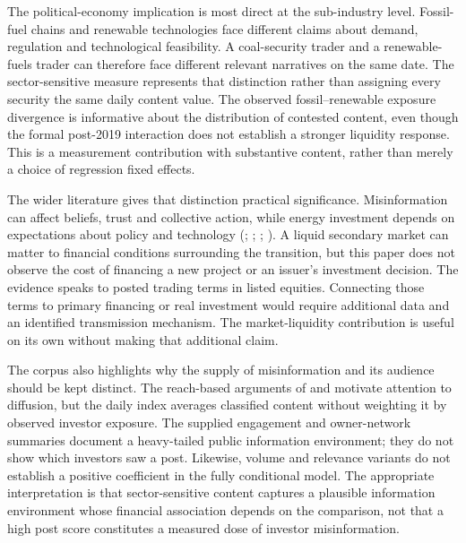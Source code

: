\documentclass{article}
\theoremstyle{plain}
\begin{document}
The political-economy implication is most direct at the sub-industry level. Fossil-fuel chains and renewable technologies face different claims about demand, regulation and technological feasibility. A coal-security trader and a renewable-fuels trader can therefore face different relevant narratives on the same date. The sector-sensitive measure represents that distinction rather than assigning every security the same daily content value. The observed fossil--renewable exposure divergence is informative about the distribution of contested content, even though the formal post-2019 interaction does not establish a stronger liquidity response. This is a measurement contribution with substantive content, rather than merely a choice of regression fixed effects.

The wider literature gives that distinction practical significance. Misinformation can affect beliefs, trust and collective action, while energy investment depends on expectations about policy and technology (\cite{cobb2025politics}; \cite{farrell2016network}; \cite{engle2020hedging}; \cite{bolton2021climate}). A liquid secondary market can matter to financial conditions surrounding the transition, but this paper does not observe the cost of financing a new project or an issuer's investment decision. The evidence speaks to posted trading terms in listed equities. Connecting those terms to primary financing or real investment would require additional data and an identified transmission mechanism. The market-liquidity contribution is useful on its own without making that additional claim.

The corpus also highlights why the supply of misinformation and its audience should be kept distinct. The reach-based arguments of \textcite{acemoglu2010spread} and \textcite{VosoughiRoyAral2018} motivate attention to diffusion, but the daily index averages classified content without weighting it by observed investor exposure. The supplied engagement and owner-network summaries document a heavy-tailed public information environment; they do not show which investors saw a post. Likewise, volume and relevance variants do not establish a positive coefficient in the fully conditional model. The appropriate interpretation is that sector-sensitive content captures a plausible information environment whose financial association depends on the comparison, not that a high post score constitutes a measured dose of investor misinformation.
\end{document}
